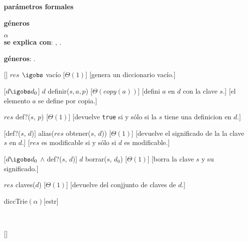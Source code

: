 
\begin{Interfaz}

  \textbf{parámetros formales}\parindent\\
  \parbox{1.7cm}{\textbf{géneros}} $\alpha$\\
 
 
  \textbf{se explica con}: , .

  \textbf{géneros}: .

  []%
  {$res$ $\igobs$ vac\'io}%
  [$\Theta(1)$]
  [genera un diccionario vac\'io.]

  [$d \igobs d_0$]
  {$d$ \igobs definir($s, a, p$)}
  [$\Theta(copy(a))$]
  [defini $a$ en $d$ con la clave $s$.]
  [el elemento $a$ se define por copia.]

  {$res$ \igobs def?($s$, $p$)}
  [$\Theta(1)$]
  [devuelve \texttt{true} si y sólo si la $s$ tiene una definicion en $d$.]

  [def?($s$, $d$)]
  {alias($res$ \igobs obtener($s$, $d$))}
  [$\Theta(1)$]
  [devuelve el significado de la la clave $s$ en $d$.]
  [$res$ es modificable si y sólo si $d$ es modificable.]

  [$d \igobs d_0$ $\land$ def?($s$, $d$)]
  {$d$ \igobs borrar($s$, $d_0$)}
  [$\Theta(1)$]
  [borra la clave $s$ y su significado.]

  {$res$ \igobs claves($d$)}
  [$\Theta(1)$]
  [devuelve del conjjunto de claves de $d$.]


\end{Interfaz}

\begin{Representacion}
  
  \begin{Estructura}{diccTrie$(\alpha)$}[estr]
    \begin{Tupla}[estr]
    \end{Tupla}

    \begin{Tupla}[nodo]
    \end{Tupla}
  \end{Estructura}




  ~

  \AbsFc[]{}[]{}

\end{Representacion}

